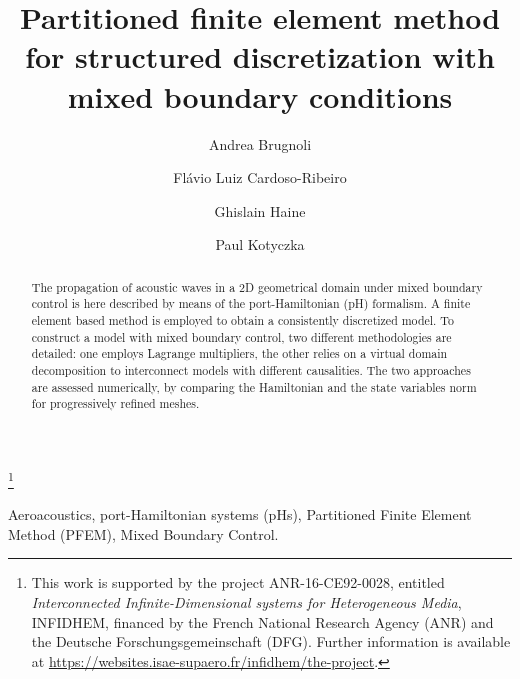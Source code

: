 \documentclass{ifacconf}
\begin{document}
\begin{frontmatter}

\title{Partitioned finite element method for structured discretization with mixed boundary conditions} 

\thanks[footnoteinfo]{This work is  supported by the project ANR-16-CE92-0028,
	entitled {\em Interconnected Infinite-Dimensional systems for Heterogeneous
		Media}, INFIDHEM, financed by the French National
	Research Agency (ANR) and the Deutsche Forschungsgemeinschaft (DFG). Further information is available at {\url{https://websites.isae-supaero.fr/infidhem/the-project}}.}

\author[ISAE]{Andrea Brugnoli} 
\author[ITA]{Fl\'avio Luiz Cardoso-Ribeiro} 
\author[ISAE]{Ghislain Haine}
\author[TUM]{Paul Kotyczka}

\address[ISAE]{ISAE-SUPAERO, Universit\'e de Toulouse,
	10 Avenue Edouard Belin, BP-54032, 31055 Toulouse Cedex 4, France
	(e-mail: \{andrea.brugnoli, ghislain.haine\}@isae.fr).}
\address[ITA]{Instituto Tecnol\'ogico de Aeron\'autica, Brazil (e-mail:flaviocr@ita.br).}
\address[TUM]{Chair of Automatic Control, Technical University of Munich, 85748 Garching, Germany (e-mail:kotyczka@tum.de).}

\begin{abstract}                %
The propagation of acoustic waves in a 2D geometrical domain under mixed boundary control is here described by means of the port-Hamiltonian (pH) formalism. A finite element based method is employed to obtain a consistently discretized model. To construct a model with mixed boundary control, two different methodologies are detailed: one employs Lagrange multipliers, the other relies on a virtual domain decomposition to interconnect models with different causalities. The two approaches are assessed numerically, by comparing the Hamiltonian and the state variables norm for progressively refined meshes.
\end{abstract}

\begin{keyword}
Aeroacoustics, port-Hamiltonian systems (pHs), Partitioned Finite Element Method (PFEM), Mixed Boundary Control.
\end{keyword}

\end{frontmatter}
\end{document}
